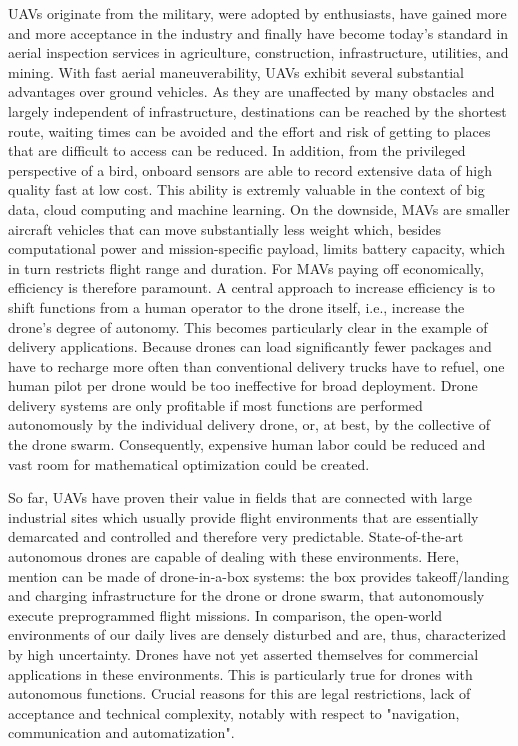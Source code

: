 UAVs originate from the military, were adopted by
enthusiasts, have gained more and more acceptance in the industry and finally have become today's standard in 
aerial inspection services in
agriculture,
construction,
infrastructure,
utilities,
and mining. \cite{McKinsey, Equinox, Percepto}
With fast aerial maneuverability,
UAVs exhibit several substantial advantages over ground vehicles.
As they are unaffected by many obstacles and largely independent of infrastructure,
destinations can be reached by the shortest route, waiting times can be avoided
and the effort and risk of getting to places that are difficult to access can be reduced. \cite{Watts2012}
In addition, from the privileged perspective of a bird, onboard sensors 
are able to record extensive data of high quality fast at low cost. \cite{PwC2016}
This ability is extremly valuable in the context of big data, cloud computing and machine learning. \cite{Garcia2019}
On the downside,
MAVs are smaller aircraft vehicles that can move substantially less weight
which, besides computational power and mission-specific payload,
limits battery capacity,
which in turn restricts flight range and duration.
For MAVs paying off economically, efficiency is therefore paramount.
A central approach to increase efficiency is to shift functions from a human operator to the drone itself,
i.e., increase the drone's degree of autonomy.
This becomes particularly clear in the example of delivery applications.
Because drones can load significantly fewer packages and
have to recharge more often than conventional delivery trucks have to refuel,
one human pilot per drone would be too ineffective for broad deployment.
Drone delivery systems are only profitable
if most functions are performed autonomously by the individual delivery drone,
or, at best, by the collective of the drone swarm.
Consequently, expensive human labor could be reduced
and vast room for mathematical optimization could be created. \cite{Chiang2019, Lee2017}


So far, UAVs have proven their value in fields that are connected with large industrial sites which usually
provide flight environments that are essentially demarcated and controlled and therefore very predictable.
State-of-the-art autonomous drones are capable of dealing with these environments.
Here, mention can be made
of drone-in-a-box systems:
the box provides takeoff/landing and charging infrastructure for
the drone or drone swarm, that autonomously execute preprogrammed flight missions. \cite{drones5040108}
In comparison,
the open-world environments of 
our daily lives 
are densely disturbed and are, thus, characterized by high uncertainty.
Drones have not yet asserted themselves for 
commercial applications in these environments.
This is particularly true for drones with
autonomous functions.
Crucial reasons for this are
legal restrictions, lack of acceptance
and technical complexity, 
notably with respect to "navigation, communication and automatization"\cite{kellermann2020drones}. \cite{Rosen2019}



